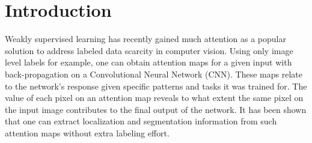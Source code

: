 \documentclass[10pt,twocolumn,letterpaper]{article}
\begin{document}
\begin{abstract}



\end{abstract}

\section{Introduction}\label{sc:intro}

Weakly supervised learning \cite{simonyan2013deep,zeiler2014visualizing,cao2015look, zhang2016top} has recently gained much attention as a popular solution to address labeled data scarcity in computer vision. Using only image level labels for example, one can obtain attention maps for a given input with back-propagation on a Convolutional Neural Network (CNN). These maps relate to the network's response given specific patterns and tasks it was trained for. The value of each pixel on an attention map reveals to what extent the same pixel on the input image contributes to the final output of the network. It has been shown that one can extract localization and segmentation information from such attention maps without extra labeling effort.

\end{document}

